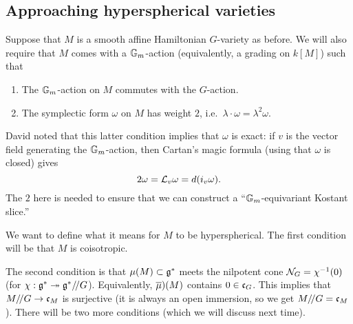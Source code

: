 \documentclass{article}
\begin{document}
\subsection{Approaching hyperspherical varieties}

Suppose that $M$ is a smooth affine Hamiltonian $G$-variety as before.
We will also require that $M$ comes with a $\mathbb{G}_m$-action (equivalently, a grading on $k[M]$) such that
\begin{enumerate}
	\item The $\mathbb{G}_m$-action on $M$ commutes with the $G$-action.
	\item The symplectic form $\omega$ on $M$ has weight $2$, i.e.\ $\lambda \cdot \omega = \lambda^2 \omega$.
\end{enumerate}
David noted that this latter condition implies that $\omega$ is exact: if $v$ is the vector field generating the $\mathbb{G}_m$-action, then Cartan's magic formula (using that $\omega$ is closed) gives
\[
	2 \omega = \mathcal{L}_v \omega = d(i_v \omega).
\]
The $2$ here is needed to ensure that we can construct a ``$\mathbb{G}_m$-equivariant Kostant slice.''

We want to define what it means for $M$ to be hyperspherical.
The first condition will be that $M$ is coisotropic.

The second condition is that $\mu(M) \subset \mathfrak{g}^*$ meets the nilpotent cone $\mathcal{N}_G = \chi^{-1}(0)$ (for $\chi: \mathfrak{g}^* \twoheadrightarrow \mathfrak{g}^* /\mkern-3mu/ G$).
Equivalently, $\overline{\mu})(M)$ contains $0 \in \mathfrak{c}_G$.
This implies that $M /\mkern-3mu/ G \to \mathfrak{c}_M$ is surjective (it is always an open immersion, so we get $M /\mkern-3mu/ G = \mathfrak{c}_M$).
There will be two more conditions (which we will discuss next time).
\end{document}
